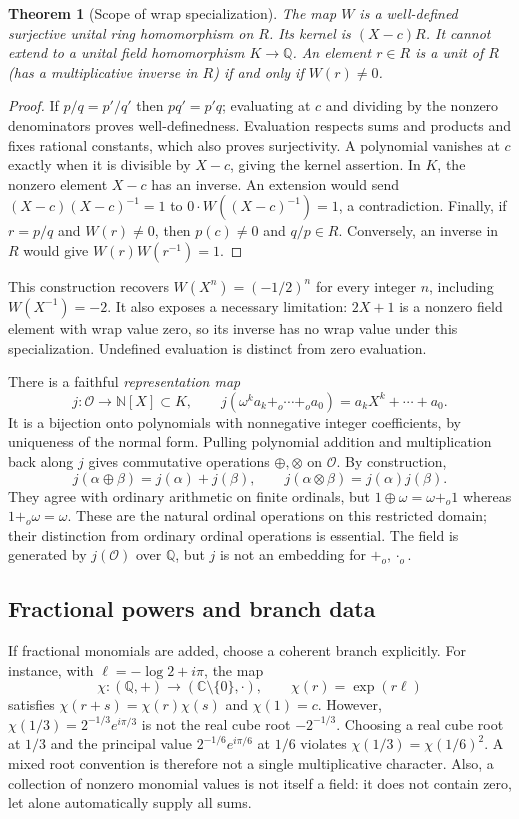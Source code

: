 \documentclass[11pt]{article}
\newtheorem{theorem}{Theorem}[section]
\theoremstyle{definition}
\newcommand{\N}{\mathbb N}
\newcommand{\Q}{\mathbb Q}
\newcommand{\C}{\mathbb C}
\newcommand{\Ord}{\mathcal O}
\begin{document}
\begin{theorem}[Scope of wrap specialization]
The map $W$ is a well-defined surjective unital ring homomorphism on $R$. Its kernel is $(X-c)R$. It cannot extend to a unital field homomorphism $K\to\Q$. An element $r\in R$ is a unit of $R$ (has a multiplicative inverse in $R$) if and only if $W(r)\ne0$.
\end{theorem}
\begin{proof}
If $p/q=p'/q'$ then $pq'=p'q$; evaluating at $c$ and dividing by the nonzero denominators proves well-definedness. Evaluation respects sums and products and fixes rational constants, which also proves surjectivity. A polynomial vanishes at $c$ exactly when it is divisible by $X-c$, giving the kernel assertion. In $K$, the nonzero element $X-c$ has an inverse. An extension would send
$(X-c)(X-c)^{-1}=1$ to $0\cdot W((X-c)^{-1})=1$, a contradiction. Finally, if $r=p/q$ and $W(r)\ne0$, then $p(c)\ne0$ and $q/p\in R$. Conversely, an inverse in $R$ would give $W(r)W(r^{-1})=1$.
\end{proof}

This construction recovers $W(X^n)=(-1/2)^n$ for every integer $n$, including $W(X^{-1})=-2$. It also exposes a necessary limitation: $2X+1$ is a nonzero field element with wrap value zero, so its inverse has no wrap value under this specialization. Undefined evaluation is distinct from zero evaluation.

There is a faithful \emph{representation map}
\[
j\colon \Ord\longrightarrow\N[X]\subset K,\qquad
j(\omega^k a_k+_o\cdots+_o a_0)=a_kX^k+\cdots+a_0.
\]
It is a bijection onto polynomials with nonnegative integer coefficients, by uniqueness of the normal form. Pulling polynomial addition and multiplication back along $j$ gives commutative operations $\oplus,\otimes$ on $\Ord$. By construction,
\[
j(\alpha\oplus\beta)=j(\alpha)+j(\beta),\qquad
j(\alpha\otimes\beta)=j(\alpha)j(\beta).
\]
They agree with ordinary arithmetic on finite ordinals, but
$1\oplus\omega=\omega+_o1$ whereas $1+_o\omega=\omega$.
These are the natural ordinal operations on this restricted domain; their distinction from ordinary ordinal operations is essential. The field is generated by $j(\Ord)$ over $\Q$, but $j$ is not an embedding for $+_o,\cdot_o$.

\subsection{Fractional powers and branch data}
If fractional monomials are added, choose a coherent branch explicitly. For instance, with $\ell=-\log 2+i\pi$, the map
\[
\chi:(\Q,+)\longrightarrow(\C\setminus\{0\},\cdot),
\qquad \chi(r)=\exp(r\ell)
\]
satisfies $\chi(r+s)=\chi(r)\chi(s)$ and $\chi(1)=c$. However, $\chi(1/3)=2^{-1/3}e^{i\pi/3}$ is not the real cube root $-2^{-1/3}$. Choosing a real cube root at $1/3$ and the principal value $2^{-1/6}e^{i\pi/6}$ at $1/6$ violates $\chi(1/3)=\chi(1/6)^2$. A mixed root convention is therefore not a single multiplicative character. Also, a collection of nonzero monomial values is not itself a field: it does not contain zero, let alone automatically supply all sums.
\end{document}
